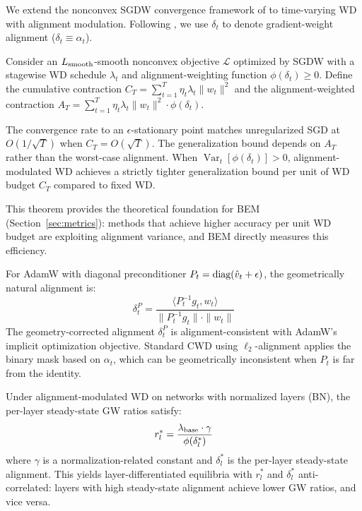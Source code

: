 \documentclass{article}
\begin{document}
We extend the nonconvex SGDW convergence framework of \citet{sun2025wd} to time-varying WD with alignment modulation. Following \citet{sun2025wd}, we use $\delta_t$ to denote gradient-weight alignment ($\delta_t \equiv \alpha_t$).

\begin{theorem}
\label{thm:contraction}
Consider an $L_{\textnormal{smooth}}$-smooth nonconvex objective $\mathcal{L}$ optimized by SGDW with a stagewise WD schedule $\lambda_t$ and alignment-weighting function $\phi(\delta_t) \geq 0$. Define the cumulative contraction $C_T = \sum_{t=1}^{T} \eta_t \lambda_t \|w_t\|^2$ and the alignment-weighted contraction $A_T = \sum_{t=1}^{T} \eta_t \lambda_t \|w_t\|^2 \cdot \phi(\delta_t)$.

The convergence rate to an $\epsilon$-stationary point matches unregularized SGD at $O(1/\sqrt{T})$ when $C_T = O(\sqrt{T})$. The generalization bound depends on $A_T$ rather than the worst-case alignment. When $\operatorname{Var}_t[\phi(\delta_t)] > 0$, alignment-modulated WD achieves a strictly tighter generalization bound per unit of WD budget $C_T$ compared to fixed WD.
\end{theorem}

This theorem provides the theoretical foundation for BEM (Section~\ref{sec:metrics}): methods that achieve higher accuracy per unit WD budget are exploiting alignment variance, and BEM directly measures this efficiency.

\begin{proposition}
\label{prop:adam_alignment}
For AdamW with diagonal preconditioner $P_t = \textnormal{diag}(\hat{v}_t + \epsilon)$, the geometrically natural alignment is:
\begin{equation}
\delta_t^P = \frac{\langle P_t^{-1} g_t, w_t \rangle}{\|P_t^{-1} g_t\| \cdot \|w_t\|}
\end{equation}
The geometry-corrected alignment $\delta_t^P$ is alignment-consistent with AdamW's implicit optimization objective. Standard CWD using $\ell_2$-alignment applies the binary mask based on $\alpha_t$, which can be geometrically inconsistent when $P_t$ is far from the identity.
\end{proposition}

\begin{proposition}
\label{prop:layer_steady}
Under alignment-modulated WD on networks with normalized layers (BN), the per-layer steady-state GW ratios satisfy:
\begin{equation}
r_l^* = \frac{\lambda_{\textnormal{base}} \cdot \gamma}{\phi(\delta_l^*)}
\end{equation}
where $\gamma$ is a normalization-related constant and $\delta_l^*$ is the per-layer steady-state alignment. This yields layer-differentiated equilibria with $r_l^*$ and $\delta_l^*$ anti-correlated: layers with high steady-state alignment achieve lower GW ratios, and vice versa.
\end{proposition}
\end{document}
